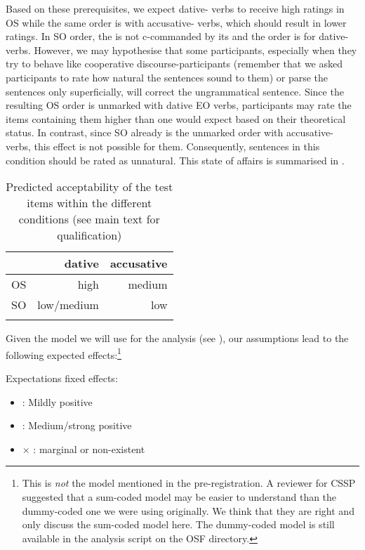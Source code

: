 \documentclass[output=paper,colorlinks,citecolor=brown]{langscibook}
\begin{document}
Based on these prerequisites, we expect dative- verbs to receive high ratings in OS  while the same order is  with accusative- verbs, which should result in lower ratings.
In SO order, the  is not c-commanded by its  and the order is  for dative- verbs. 
However, we may hypothesise that some participants, especially when they try to behave like cooperative discourse-participants (remember that we asked participants to rate how natural the sentences sound to them) or parse the sentences only superficially, will correct the ungrammatical sentence.
Since the resulting OS order is unmarked with dative EO verbs, 
participants may rate the items containing them higher than one would expect based on their theoretical  status.
In contrast, since SO already is the unmarked order with accusative- verbs, this effect is not possible for them. 
Consequently, sentences in this condition should be rated as unnatural.
This state of affairs is summarised in .

\begin{table}[t]
    \begin{tabularx}{0.42\textwidth}{lrr}
    \lsptoprule
     & dative & accusative \\
    \midrule
    OS & high & medium \\
    SO & low/medium & low \\
    \lspbottomrule
    \end{tabularx}
    \caption{Predicted acceptability of the test items within the different conditions (see main text for qualification)}
    \label{tab:predictions:Masloch}
\end{table}

Given the model we will use for the analysis (see ), our assumptions lead to the following expected effects:\footnote{This is \emph{not} the model mentioned in the pre-registration. 
A reviewer for CSSP suggested that a sum-coded model may be easier to understand than the dummy-coded one we were using originally. 
We think that they are right and only discuss the sum-coded model here.
The dummy-coded model is still available in the analysis script on the OSF directory.}
\begin{exe}
    \ex Expectations fixed effects:
    \begin{itemize}
        \item {}: Mildly positive
        \item {}: Medium/strong positive
        \item {} $\times$ : marginal or non-existent
    \end{itemize}
\end{exe}
\end{document}
